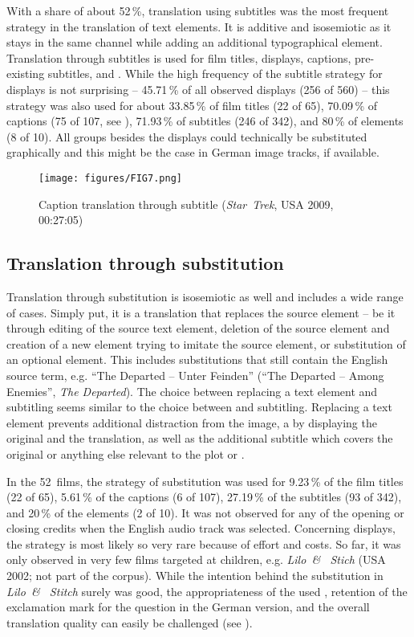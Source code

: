 With a share of about 52\,\%, translation using subtitles was the most frequent strategy in the translation of text elements. It is additive and isosemiotic as it stays in the same channel while adding an additional typographical element. Translation through subtitles is used for film titles, displays, captions, pre-existing subtitles, and . While the high frequency of the subtitle strategy for displays is not surprising – 45.71\,\% of all observed displays (256 of 560) – this strategy was also used for about 33.85\,\% of film titles (22 of 65), 70.09\,\% of captions (75 of 107, see ), 71.93\,\% of subtitles (246 of 342), and 80\,\% of  elements (8 of 10). All groups besides the displays could technically be substituted graphically and this might be the case in German image tracks, if available.

\begin{figure}
\texttt{[image: figures/FIG7.png]}
\caption{Caption translation through subtitle (\textit{Star~Trek}, USA 2009, 00:27:05)}
\label{fig:FIG7}
\end{figure}

\subsection{Translation through substitution}\label{sec:2.5.3}

Translation through substitution is isosemiotic as well and includes a wide range of cases. Simply put, it is a translation that replaces the source element – be it through editing of the source text element, deletion of the source element and creation of a new element trying to imitate the source element, or substitution of an optional element. This includes substitutions that still contain the English source term, e.g. “The Departed – Unter Feinden” (“The Departed – Among Enemies”, \textit{The Departed}). The choice between replacing a text element and subtitling seems similar to the choice between  and subtitling. Replacing a text element prevents additional distraction from the image, a  by displaying the original and the translation, as well as the additional subtitle which covers the original or anything else relevant to the plot or .

In the 52~films, the strategy of substitution was used for 9.23\,\% of the film titles (22 of 65), 5.61\,\% of the captions (6 of 107), 27.19\,\% of the subtitles (93 of 342), and 20\,\% of the  elements (2 of 10). It was not observed for any of the opening or closing credits when the English audio track was selected. Concerning displays, the strategy is most likely so very rare because of effort and costs. So far, it was only observed in very few films targeted at children, e.g. \textit{Lilo~\& ~Stich} (USA 2002; not part of the corpus). While the intention behind the substitution in \textit{Lilo~\& ~Stitch} surely was good, the appropriateness of the used , retention of the exclamation mark for the question in the German version, and the overall translation quality can easily be challenged (see ).

